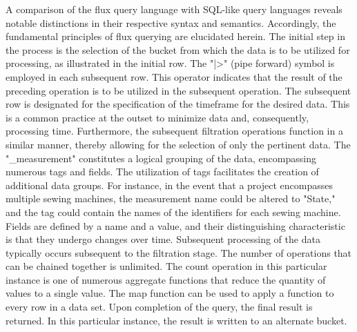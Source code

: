 A comparison of the flux query language with SQL-like query languages reveals notable distinctions in their respective syntax and semantics. Accordingly, the fundamental principles of flux querying are elucidated herein. The initial step in the process is the selection of the bucket from which the data is to be utilized for processing, as illustrated in the initial row. The "|>" (pipe forward) symbol is employed in each subsequent row. This operator indicates that the result of the preceding operation is to be utilized in the subsequent operation. The subsequent row is designated for the specification of the timeframe for the desired data. This is a common practice at the outset to minimize data and, consequently, processing time. Furthermore, the subsequent filtration operations function in a similar manner, thereby allowing for the selection of only the pertinent data. The "\_measurement" constitutes a logical grouping of the data, encompassing numerous tags and fields. The utilization of tags facilitates the creation of additional data groups. For instance, in the event that a project encompasses multiple sewing machines, the measurement name could be altered to "State," and the tag could contain the names of the identifiers for each sewing machine.  Fields are defined by a name and a value, and their distinguishing characteristic is that they undergo changes over time. Subsequent processing of the data typically occurs subsequent to the filtration stage. The number of operations that can be chained together is unlimited. The count operation in this particular instance is one of numerous aggregate functions that reduce the quantity of values to a single value. The map function can be used to apply a function to every row in a data set. Upon completion of the query, the final result is returned. In this particular instance, the result is written to an alternate bucket.






